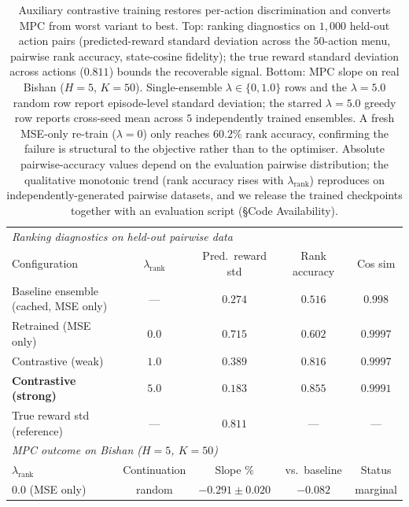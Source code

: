 \documentclass[11pt]{article}
\begin{document}
\begin{table}[htbp]
\centering
\small
\caption{Auxiliary contrastive training restores per-action discrimination and converts MPC from worst variant to best. Top: ranking diagnostics on $1{,}000$ held-out action pairs (predicted-reward standard deviation across the $50$-action menu, pairwise rank accuracy, state-cosine fidelity); the true reward standard deviation across actions ($0.811$) bounds the recoverable signal. Bottom: MPC slope on real Bishan ($H{=}5$, $K{=}50$). Single-ensemble $\lambda \in \{0, 1.0\}$ rows and the $\lambda{=}5.0$ random row report episode-level standard deviation; the starred $\lambda{=}5.0$ greedy row reports cross-seed mean across $5$ independently trained ensembles. A fresh MSE-only re-train ($\lambda{=}0$) only reaches $60.2\%$ rank accuracy, confirming the failure is structural to the objective rather than to the optimiser. Absolute pairwise-accuracy values depend on the evaluation pairwise distribution; the qualitative monotonic trend (rank accuracy rises with $\lambda_{\text{rank}}$) reproduces on independently-generated pairwise datasets, and we release the trained checkpoints together with an evaluation script (\S Code Availability).}
\label{tab:contrastive}
\begin{tabular}{lccccc}
\toprule
\multicolumn{6}{l}{\textit{Ranking diagnostics on held-out pairwise data}} \\
Configuration & $\lambda_{\text{rank}}$ & \multicolumn{2}{c}{Pred.\ reward std} & Rank accuracy & Cos sim \\
\midrule
Baseline ensemble (cached, MSE only) & --- & \multicolumn{2}{c}{$0.274$} & $0.516$ & $0.998$ \\
Retrained (MSE only)                  & $0.0$ & \multicolumn{2}{c}{$0.715$} & $0.602$ & $0.9997$ \\
Contrastive (weak)                    & $1.0$ & \multicolumn{2}{c}{$0.389$} & $0.816$ & $0.9997$ \\
\textbf{Contrastive (strong)}         & $\mathbf{5.0}$ & \multicolumn{2}{c}{$0.183$} & $\mathbf{0.855}$ & $\mathbf{0.9991}$ \\
True reward std (reference)           & --- & \multicolumn{2}{c}{$0.811$} & --- & --- \\
\midrule
\multicolumn{6}{l}{\textit{MPC outcome on Bishan ($H{=}5$, $K{=}50$)}} \\
$\lambda_{\text{rank}}$ & Continuation & \multicolumn{2}{c}{Slope \%} & vs.\ baseline & Status \\
\midrule
0.0 (MSE only)                  & random & \multicolumn{2}{c}{$-0.291 \pm 0.020$} & $-0.082$ & marginal \\

\end{tabular}
\end{table}
\end{document}
